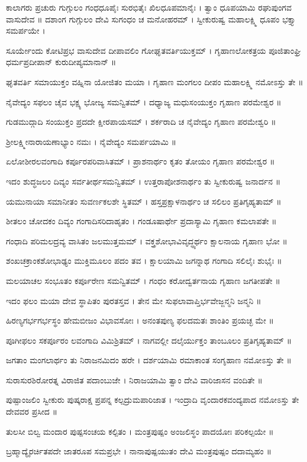 ಕಾಲಾಗರು ಪ್ರಚುರು ಗುಗ್ಗುಲಂ ಗಂಧಧೂಪೈಃ ಸುರಭಿತೈಃ ಖಿಲಧೂಪಮಾನೈಃ । ತ್ವಾಂ ಧೂಪಯಾಮಿ ರಘುಪುಂಗವ ವಾಸುದೇವ ॥
ದಶಾಂಗ ಗುಗ್ಗುಲಂ ದೇವಿ ಸುಗಂಧಂ ಚ ಮನೋಹರಮ್ । ಸ್ವೀಕುರುಷ್ವ ಮಹಾಲಕ್ಷ್ಮಿ ಧೂಪಂ ಭಕ್ತ್ಯಾ ಸಮರ್ಪಯೇ ।

ಸೂರ್ಯೇಂದು ಕೋಟಿಪ್ರಭ ವಾಸುದೇವ ದೀಪಾವಲಿಂ ಗೋಘೃತವರ್ತಿಯುಕ್ತಮ್ ।
ಗೃಹಾಣಲೋಕತ್ರಯ ಪೂಜಿತಾಂಘ್ರಿ ಧರ್ಮಪ್ರದೀಪಾನ್ ಕುರುದೀಪ್ಯಮಾನಾನ್ ॥

ಘೃತವರ್ತಿ ಸಮಾಯುಕ್ತಂ ವಹ್ನಿನಾ ಯೋಜಿತಂ ಮಯಾ । ಗೃಹಾಣ ಮಂಗಲಂ ದೀಪಂ ಮಹಾಲಕ್ಷ್ಮಿ ನಮೋಽಸ್ತು ತೇ ॥

ನೈವೇದ್ಯಂ ಸಫಲಂ ಚೈವ ಭಕ್ಷ್ಯ ಭೋಜ್ಯ ಸಮನ್ವಿತಮ್ । ದಧ್ಯಾಜ್ಯ ಮಧುಸಂಯುಕ್ತಂ  ಗೃಹಾಣ ಪರಮೇಶ್ವರ ॥

ಗುಡಮುದ್ಗಾದಿ ಸಂಯುಕ್ತಂ ಪ್ರದದೇ ಕ್ಷೀರಪಾಯಸಮ್ । ಶರ್ಕರಾದಿ ಚ ನೈವೇದ್ಯಂ ಗೃಹಾಣ ಪರಮೇಶ್ವರಿ ॥

ಶ್ರೀಲಕ್ಷ್ಮೀನಾರಾಯಣಾಭ್ಯಾಂ ನಮಃ । ನೈವೇದ್ಯಂ ಸಮರ್ಪಯಾಮಿ ॥

 ಏಲೋಶೀರಲವಂಗಾದಿ ಕರ್ಪೂರಪರಿವಾಸಿತಮ್ । ಪ್ರಾಶನಾರ್ಥಂ ಕೃತಂ ತೋಯಂ ಗೃಹಾಣ ಪರಮೇಶ್ವರ ॥
 
 ಇದಂ ಶುದ್ಧಜಲಂ ದಿವ್ಯಂ ಸರ್ವತೀರ್ಥಸಮನ್ವಿತಮ್ । ಉತ್ತರಾಪೋಶನಾರ್ಥಂ ತು ಸ್ವೀಕುರುಷ್ವ ಜನಾರ್ದನ ॥
 
ಯಮುನಾಯಾ ಸಮಾನೀತಂ ಸುವರ್ಣಕಲಶೇ ಸ್ಥಿತಮ್ । ಹಸ್ತಪ್ರಕ್ಷಾಳನಾರ್ಥಂ ಚ ಸಲಿಲಂ ಪ್ರತಿಗೃಹ್ಯತಾಮ್ ॥ 
 
ಶೀತಲಂ ಚೋದಕಂ ದಿವ್ಯಂ ಗಂಗಾದಿಸರಿದಾಹೃತಂ । ಗಂಡೂಷಾರ್ಥೇ ಪ್ರದಾಸ್ಯಾಮಿ ಗೃಹಾಣ ಕಮಲಾಪತೇ ॥

ಗಂಧಾದಿ ಪರಿಮಲದ್ರವ್ಯ ವಾಸಿತಂ ಜಲಮುತ್ತಮಮ್ । ವಕ್ತ್ರಶೋಭಾವಿವೃದ್ಧ್ಯರ್ಥಂ ಕ್ಷಾಲನಾಯ ಗೃಹಾಣ ಭೋ ॥

ಶಂಖಚಕ್ರಾಂಕಶೋಭಾಢ್ಯಂ ಮುಕ್ತಿಮೂಲಂ ಪದಂ ತವ । ಕ್ಷಾಲಯಾಮಿ ಜಗನ್ನಾಥ ಗಂಗಾದಿ ಸಲಿಲೈಃ ಶುಭೈಃ ॥

ಮಲಯಾಚಲ ಸಂಭೂತಂ ಕರ್ಪೂರೇಣ ಸಮನ್ವಿತಮ್ । ಗಂಧಂ ಕರೋದ್ವರ್ತನಾಯ ಗೃಹಾಣ ಜಗತೀಪತೇ ॥

ಇದಂ ಫಲಂ ಮಯಾ ದೇವ ಸ್ಥಾಪಿತಂ ಪುರತಸ್ತವ । ತೇನ ಮೇ ಸುಫಲಾವಾಪ್ತಿರ್ಭವೇಜ್ಜನ್ಮನಿ ಜನ್ಮನಿ ॥

ಹಿರಣ್ಯಗರ್ಭಗರ್ಭಸ್ಥಂ ಹೇಮಬೀಜಂ ವಿಭಾವಸೋಃ । ಅನಂತಪುಣ್ಯ ಫಲದಮತಃ ಶಾಂತಿಂ ಪ್ರಯಚ್ಛ ಮೇ ॥

ಪೂಗೀಫಲಂ ಸಕರ್ಪೂರಂ ಲವಂಗಾದಿ ವಿಮಿಶ್ರಿತಮ್ । ನಾಗವಲ್ಲೀ ದಲೈರ್ಯುಕ್ತಂ ತಾಂಬೂಲಂ ಪ್ರತಿಗೃಹ್ಯತಾಮ್ ॥

ಜಗತಾಂ ಮಂಗಲಾರ್ಥಂ ತು ನಿರಾಜನಮಿದಂ ಹರೇ । ದರ್ಶಯಾಮಿ ರಮಾಕಾಂತ ಸಂಗೃಹಾಣ ನಮೋಽಸ್ತು ತೇ ॥

ಸುರಾಸುರಶಿರೋರತ್ನ ವಿರಾಜಿತ ಪದಾಂಬುಜೇ । ನಿರಾಜಯಾಮಿ ತ್ವಾಂ ದೇವಿ ವಾರಿಜಾಸನ ವಂದಿತೇ ॥

ಪುಷ್ಪಾಂಜಲಿಂ ಸ್ವೀಕುರು ಪುಷ್ಕರಾಕ್ಷ ಪ್ರಪನ್ನ ಕಲ್ಪದ್ರುಮಪಾರಿಜಾತ । ಇಂದ್ರಾದಿ ವೃಂದಾರಕವಂದ್ಯಪಾದ ನಮೋಽಸ್ತು ತೇ ದೇವವರ ಪ್ರಸೀದ ॥

ತುಲಸೀ ಬಿಲ್ವ ಮಂದಾರ ಪುಷ್ಪಸಂಚಯ ಕಲ್ಪಿತಂ । ಮಂತ್ರಪುಷ್ಪಂ ಅಂಜಲಿಸ್ಥಂ ಪಾದಯೋಃ ಪರಿಕಲ್ಪಯೇ ॥

ಬ್ರಹ್ಮಾದ್ಯೈರರ್ಚಿತಪದೇ ಜಾತರೂಪ ಸಮಪ್ರಭೇ । ನಾನಾಪುಷ್ಪಯುತಂ ದೇವಿ ಮಂತ್ರಪುಷ್ಪಂ ದದಾಮ್ಯಹಂ ॥





